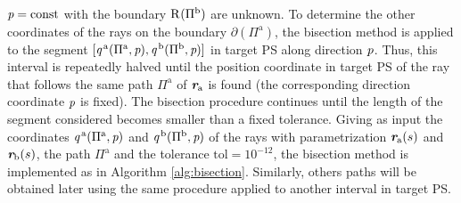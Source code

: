 $\textit{p}=\textrm{const}$ with the boundary $\mbox{$\textup{R}_{\textit{}}$}(\Pi^{\textrm{b}})$ are unknown. To determine the other coordinates of the rays on the boundary $\partial$$(\Pi^{\textrm{a}})$, the bisection method is applied to the segment $[\textit{q}^{\,\textrm{a}}(\Pi^{\textrm{a}}, \textit{p}), \textit{q}^{\,\textrm{b}}(\Pi^{\textrm{b}}, \textit{p})]$ in target PS  along direction $\textit{p}$. Thus, this interval is repeatedly halved until the position coordinate in target PS of the ray that follows the same path $\Pi^{\textrm{a}}$ of $\textit{\textbf{r}}_{\textrm{a}}$ is found (the corresponding direction coordinate $\textit{p}$ is fixed). The bisection procedure continues until the length of the segment considered becomes smaller than a fixed tolerance. 
Giving as input the coordinates $\textit{q}^{\,\textrm{a}}(\Pi^{\textrm{a}}, \textit{p})$ and $\textit{q}^{\,\textrm{b}}(\Pi^{\textrm{b}}, \textit{p})$ of the rays with parametrization $\textit{\textbf{r}}_{\textrm{a}}(s)$ and $\textit{\textbf{r}}_{\textrm{b}}(s)$, the path $\Pi^\textrm{a}$ and the tolerance $\textrm{tol}= 10^{-12}$, the bisection method is implemented as in Algorithm \ref{alg:bisection}. Similarly, others paths will be obtained later using the same procedure applied to another interval in target PS.
